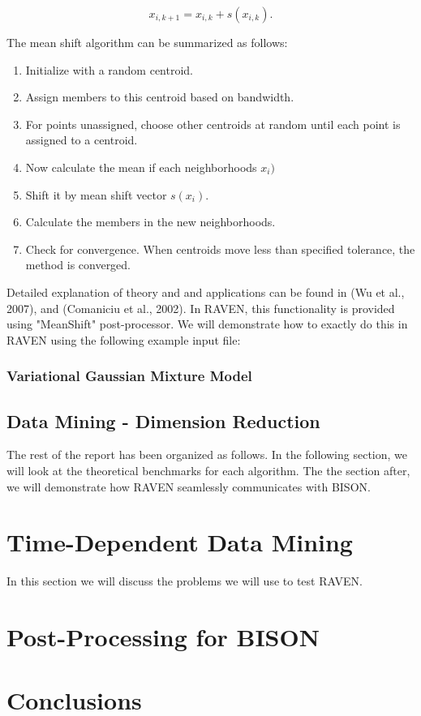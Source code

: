 \documentclass[11pt]{article}
\begin{document}
\begin{equation}
x_{i, k+1} = x_{i, k} + s(x_{i, k}).
\end{equation}

The mean shift algorithm can be summarized as follows:

\begin{enumerate}

\item Initialize with a random centroid. 

\item Assign members to this centroid based on bandwidth. 

\item For points unassigned, choose other centroids at random until each point is assigned to a centroid. 

\item Now calculate the mean if each neighborhoods $x_i)$ 

\item Shift it by mean shift vector $s(x_i)$. 

\item Calculate the members in the new neighborhoods. 

\item Check for convergence. When centroids move less than specified tolerance, the method is converged. 
 
\end{enumerate}

Detailed explanation of theory and and applications can be found in (Wu et al., 2007), and (Comaniciu et al., 2002). In RAVEN, this functionality is provided using "MeanShift" post-processor. We will demonstrate how to exactly do this in RAVEN using the following example input file: 


\subsubsection{Variational Gaussian Mixture Model}

\subsection{Data Mining - Dimension Reduction}

The rest of the report has been organized as follows. In the following section, we will look at the theoretical benchmarks for each algorithm. The the section after, we will demonstrate how RAVEN seamlessly communicates with BISON.  

\section{Time-Dependent Data Mining}

In this section we will discuss the problems we will use to test RAVEN. 

\section{Post-Processing for BISON}



\section{Conclusions}
\end{document}
